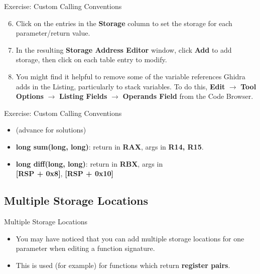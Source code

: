 \documentclass{beamer}
\begin{document}
\begin{frame}
\begin{block}{Exercise: Custom Calling Conventions}
\begin{enumerate}
\setcounter{enumi}{5}
\item Click on the entries in the \textbf{Storage} column to set the storage for each parameter/return value.
\item In the resulting \textbf{Storage Address Editor} window, click \textbf{Add} to add storage, then click on each
table entry to modify.
\item You might find it helpful to remove some of the variable references Ghidra adds in the Listing, particularly to stack variables.  To do this, \textbf{Edit} 
$\rightarrow$ \textbf{Tool Options} $\rightarrow$ \textbf{Listing Fields} $\rightarrow$ \textbf{Operands Field} from the Code Browser.
\end{enumerate}
\end{block}
\end{frame}

\begin{frame}
\begin{block}{Exercise: Custom Calling Conventions}
\begin{itemize}
\item[] (advance for solutions)
\pause
\item \textbf{long sum(long, long)}: return in \textbf{RAX}, args in \textbf{R14, R15}.
\item \textbf{long diff(long, long)}: return in \textbf{RBX}, args in \\ \textbf{[RSP + 0x8]}, \textbf{[RSP + 0x10]}
\end{itemize}
\end{block}
\end{frame}

\subsection{Multiple Storage Locations}
\begin{frame}
\begin{block}{Multiple Storage Locations}
\begin{itemize}
\item You may have noticed that you can add multiple storage locations for one parameter when editing a function signature.
\item This is used (for example) for functions which return \textbf{register pairs}.
\end{itemize}
\end{block}
\end{frame}
\end{document}
